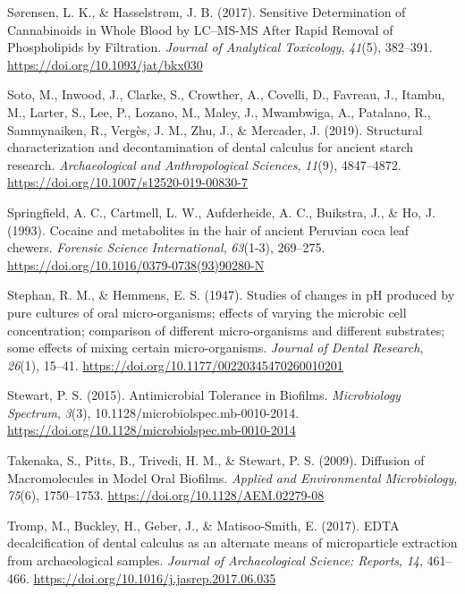 \documentclass[
  letterpaper,
]{book}
\newlength{\cslhangindent}
\newlength{\cslentryspacingunit} %
\newenvironment{CSLReferences}[2] %
 {%
  \setlength{\parindent}{0pt}
  \ifodd #1
  \let\oldpar\par
  \def\par{\hangindent=\cslhangindent\oldpar}
  \fi
  \setlength{\parskip}{#2\cslentryspacingunit}
 }%
 {}
\begin{document}
\begin{CSLReferences}{1}{0}
\leavevmode{}%
Sørensen, L. K., \& Hasselstrøm, J. B. (2017). Sensitive {Determination}
of {Cannabinoids} in {Whole Blood} by {LC}--{MS-MS After Rapid Removal}
of {Phospholipids} by {Filtration}. \emph{Journal of Analytical
Toxicology}, \emph{41}(5), 382--391.
\url{https://doi.org/10.1093/jat/bkx030}

\leavevmode{}%
Soto, M., Inwood, J., Clarke, S., Crowther, A., Covelli, D., Favreau,
J., Itambu, M., Larter, S., Lee, P., Lozano, M., Maley, J., Mwambwiga,
A., Patalano, R., Sammynaiken, R., Vergès, J. M., Zhu, J., \& Mercader,
J. (2019). Structural characterization and decontamination of dental
calculus for ancient starch research. \emph{Archaeological and
Anthropological Sciences}, \emph{11}(9), 4847--4872.
\url{https://doi.org/10.1007/s12520-019-00830-7}

\leavevmode{}%
Springfield, A. C., Cartmell, L. W., Aufderheide, A. C., Buikstra, J.,
\& Ho, J. (1993). Cocaine and metabolites in the hair of ancient
{Peruvian} coca leaf chewers. \emph{Forensic Science International},
\emph{63}(1-3), 269--275.
\url{https://doi.org/10.1016/0379-0738(93)90280-N}

\leavevmode{}%
Stephan, R. M., \& Hemmens, E. S. (1947). Studies of changes in {pH}
produced by pure cultures of oral micro-organisms; effects of varying
the microbic cell concentration; comparison of different micro-organisms
and different substrates; some effects of mixing certain
micro-organisms. \emph{Journal of Dental Research}, \emph{26}(1),
15--41. \url{https://doi.org/10.1177/00220345470260010201}

\leavevmode{}%
Stewart, P. S. (2015). Antimicrobial {Tolerance} in {Biofilms}.
\emph{Microbiology Spectrum}, \emph{3}(3),
10.1128/microbiolspec.mb-0010-2014.
\url{https://doi.org/10.1128/microbiolspec.mb-0010-2014}

\leavevmode{}%
Takenaka, S., Pitts, B., Trivedi, H. M., \& Stewart, P. S. (2009).
Diffusion of {Macromolecules} in {Model Oral Biofilms}. \emph{Applied
and Environmental Microbiology}, \emph{75}(6), 1750--1753.
\url{https://doi.org/10.1128/AEM.02279-08}

\leavevmode{}%
Tromp, M., Buckley, H., Geber, J., \& Matisoo-Smith, E. (2017). {EDTA}
decalcification of dental calculus as an alternate means of
microparticle extraction from archaeological samples. \emph{Journal of
Archaeological Science: Reports}, \emph{14}, 461--466.
\url{https://doi.org/10.1016/j.jasrep.2017.06.035}


\end{CSLReferences}
\end{document}
